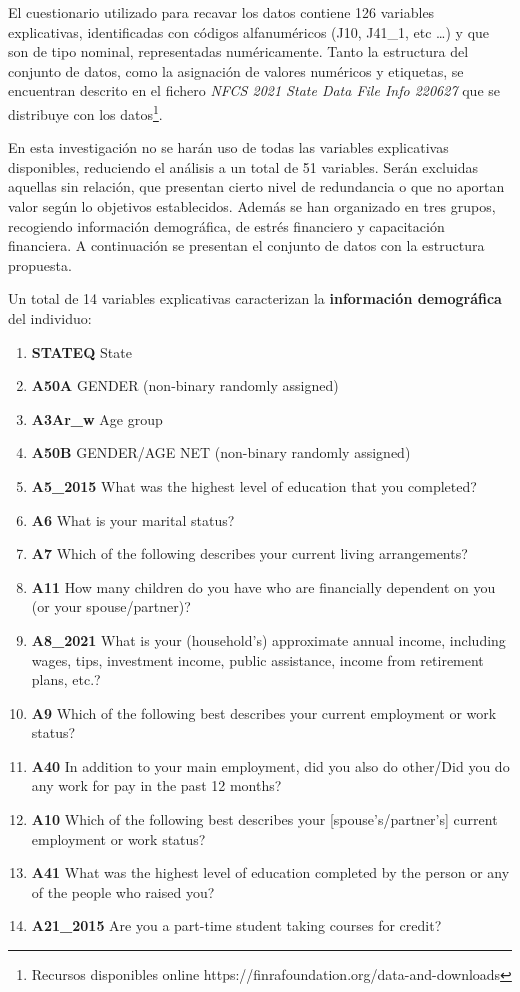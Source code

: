\documentclass[a4paper, 11pt, bibliography=numbered, es]{article}
\begin{document}
El cuestionario utilizado para recavar los datos contiene 126 variables explicativas, identificadas con códigos 
alfanuméricos (J10, J41\_1, etc \dots) y que son de tipo nominal, representadas numéricamente. Tanto la estructura
del conjunto de datos, como la asignación de valores numéricos y etiquetas, se encuentran descrito en el fichero 
\textit{NFCS 2021 State Data File Info 220627} que se distribuye con los datos\footnote{Recursos disponibles online https://finrafoundation.org/data-and-downloads}. 

En esta investigación no se harán uso de todas las variables explicativas disponibles, reduciendo el análisis a un total de 51 variables. Serán excluidas aquellas sin relación, que presentan cierto nivel de redundancia o que no aportan valor según lo
objetivos establecidos. Además se han organizado en tres grupos, recogiendo información demográfica, de estrés financiero y
capacitación financiera. A continuación se presentan el conjunto de datos con la estructura propuesta.

Un total de 14 variables explicativas caracterizan la \textbf{información demográfica} del individuo:
\begin{enumerate}
    \item \textbf{STATEQ} State
    \item \textbf{A50A} GENDER (non-binary randomly assigned)
    \item \textbf{A3Ar\_w} Age group
    \item \textbf{A50B} GENDER/AGE NET (non-binary randomly assigned)
    \item \textbf{A5\_2015} What was the highest level of education that you completed?
    \item \textbf{A6} What is your marital status?
    \item \textbf{A7} Which of the following describes your current living arrangements?
    \item \textbf{A11} How many children do you have who are financially dependent on you (or your spouse/partner)? 
    \item \textbf{A8\_2021} What is your (household's) approximate annual income, including wages, tips, investment
    income, public assistance, income from retirement plans, etc.?
    \item \textbf{A9} Which of the following best describes your current employment or work status?
    \item \textbf{A40} In addition to your main employment, did you also do other/Did you do any work for pay
    in the past 12 months?
    \item \textbf{A10} Which of the following best describes your [spouse's/partner's] current employment or
    work status? 
    \item \textbf{A41} What was the highest level of education completed by the person or any of the people who
    raised you?
    \item \textbf{A21\_2015} Are you a part-time student taking courses for credit?
\end{enumerate}
\end{document}
